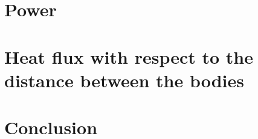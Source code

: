 \documentclass[a4paper,12pt,twoside]{article}
\begin{document}

\section{Power}

\section{Heat flux with respect to the distance between the bodies}

\section{Conclusion}
\end{document}

